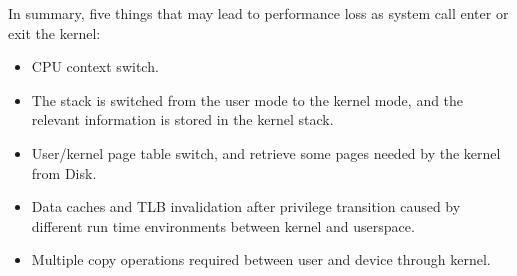 In summary, five things that may lead to performance loss as system call enter or exit the kernel:

\begin{itemize}
  \item CPU context switch.
  \item The stack is switched from the user mode to the kernel mode, and the relevant information is stored in the kernel stack.
  \item User/kernel page table switch, and retrieve some pages needed by the kernel from Disk.
  \item Data caches and TLB invalidation after privilege transition caused by different run time environments between kernel and userspace.
   \item Multiple copy operations required between user and device through kernel.
\end{itemize}
\cleardoublepage

